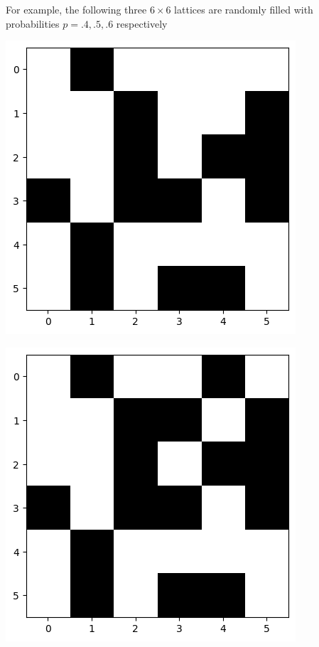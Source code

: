 \documentclass[compress]{beamer}
\begin{document}
\begin{frame}

    For example, the following three \(6\times 6\) lattices are randomly filled with
    probabilities \(p=.4, .5, .6\) respectively

    \vspace{15pt}

    \begin{minipage}{.3\linewidth}
        \includegraphics[width=\linewidth]{p1.png}
    \end{minipage}\hfill%
    \begin{minipage}{.3\linewidth}
        \includegraphics[width=\linewidth]{p2.png}

\end{minipage}
\end{frame}
\end{document}
